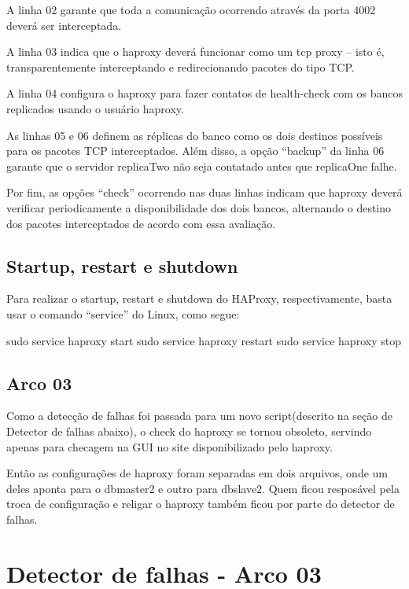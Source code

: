 \documentclass[a4paper,10pt]{article}
\begin{document}
        A linha 02 garante que toda a comunicação ocorrendo através da porta 4002 deverá ser interceptada.

        A linha 03 indica  que o haproxy deverá funcionar como um tcp proxy – isto é, transparentemente interceptando e redirecionando pacotes do tipo TCP.

        A linha 04 configura o haproxy para fazer contatos de health-check com os bancos replicados usando o usuário haproxy.

        As linhas 05 e 06 definem as réplicas do banco como os dois destinos possíveis para os pacotes TCP interceptados. Além disso, a opção “backup” da linha 06 garante que o servidor replicaTwo não seja contatado antes que replicaOne falhe.

        Por fim, as opções “check” ocorrendo nas duas linhas indicam que haproxy deverá verificar periodicamente a disponibilidade dos dois bancos, alternando o destino dos pacotes interceptados de acordo com essa avaliação.

    \subsection{Startup, restart e shutdown}

        Para realizar o startup, restart e shutdown do HAProxy, respectivamente, basta usar o comando “service” do Linux, como segue:

        \begin{spverbatim}
        sudo service haproxy start
        sudo service haproxy restart
        sudo service haproxy stop
        \end{spverbatim}

    \subsection{Arco 03}

    Como a detecção de falhas foi passada para um novo script(descrito na seção de Detector de falhas abaixo), o check do haproxy se tornou obsoleto, servindo apenas para checagem na GUI no site disponibilizado pelo haproxy.

Então as configurações de haproxy foram separadas em dois arquivos, onde um deles aponta para o dbmaster2 e outro para dbslave2. Quem ficou resposável pela troca de configuração e religar o haproxy também ficou por parte do detector de falhas.


\section{Detector de falhas - Arco 03}
\end{document}
